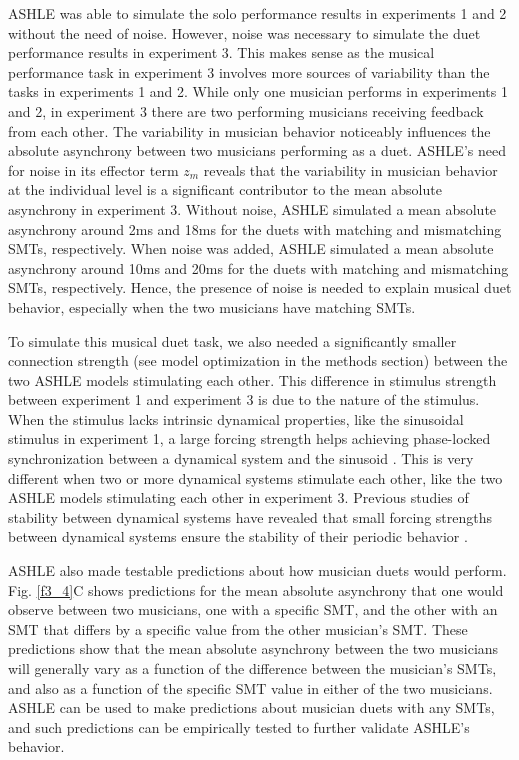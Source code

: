 \documentclass{report}
\begin{document}
ASHLE was able to simulate the solo performance results in experiments 1 and 2 without the need of noise. However, noise was necessary to simulate the duet performance results in experiment 3. This makes sense as the musical performance task in experiment 3 involves more sources of variability than the tasks in experiments 1 and 2. While only one musician performs in experiments 1 and 2, in experiment 3 there are two performing musicians receiving feedback from each other. The variability in musician behavior noticeably influences the absolute asynchrony between two musicians performing as a duet. ASHLE's need for noise in its effector term $z_m$ reveals that the variability in musician behavior at the individual level is a significant contributor to the mean absolute asynchrony in experiment 3. Without noise, ASHLE simulated a mean absolute asynchrony around 2ms and 18ms for the duets with matching and mismatching SMTs, respectively. When noise was added, ASHLE simulated a mean absolute asynchrony around 10ms and 20ms for the duets with matching and mismatching SMTs, respectively. Hence, the presence of noise is needed to explain musical duet behavior, especially when the two musicians have matching SMTs.

To simulate this musical duet task, we also needed a significantly smaller connection strength (see model optimization in the methods section) between the two ASHLE models stimulating each other. This difference in stimulus strength between experiment 1 and experiment 3 is due to the nature of the stimulus. When the stimulus lacks intrinsic dynamical properties, like the sinusoidal stimulus in experiment 1, a large forcing strength helps achieving phase-locked synchronization between a dynamical system and the sinusoid \cite{kim2015signal}. This is very different when two or more dynamical systems stimulate each other, like the two ASHLE models stimulating each other in experiment 3. Previous studies of stability between dynamical systems have revealed that small forcing strengths between dynamical systems ensure the stability of their periodic behavior \cite{kim2015signal}.

ASHLE also made testable predictions about how musician duets would perform. Fig.{} \ref{f3_4}C shows predictions for the mean absolute asynchrony that one would observe between two musicians, one with a specific SMT, and the other with an SMT that differs by a specific value from the other musician's SMT. These predictions show that the mean absolute asynchrony between the two musicians will generally vary as a function of the difference between the musician's SMTs, and also as a function of the specific SMT value in either of the two musicians. ASHLE can be used to make predictions about musician duets with any SMTs, and such predictions can be empirically tested to further validate ASHLE's behavior.
\end{document}
